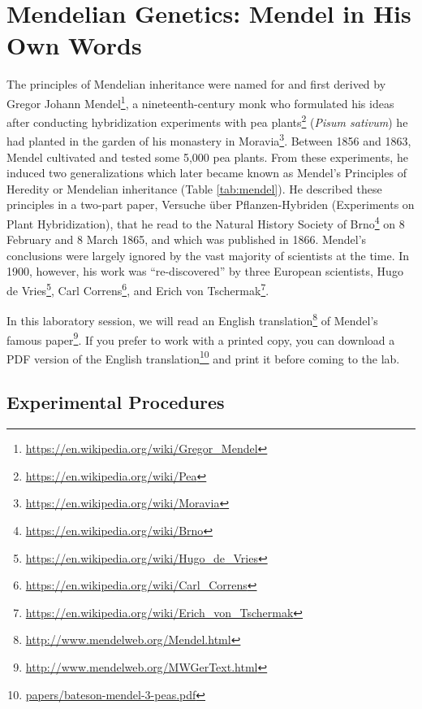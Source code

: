 \documentclass[]{book}
\let\rmarkdownfootnote\footnote%
\def\footnote{\protect\rmarkdownfootnote}
\renewcommand{\href}[2]{#2\footnote{\url{#1}}}
\begin{document}
\chapter{Mendelian Genetics: Mendel in His Own
Words}\label{mendelian-genetics-mendel-in-his-own-words}

The principles of Mendelian inheritance were named for and first derived
by \href{https://en.wikipedia.org/wiki/Gregor_Mendel}{Gregor Johann
Mendel}, a nineteenth-century monk who formulated his ideas after
conducting hybridization experiments with
\href{https://en.wikipedia.org/wiki/Pea}{pea plants} (\emph{Pisum
sativum}) he had planted in the garden of his monastery in
\href{https://en.wikipedia.org/wiki/Moravia}{Moravia}. Between 1856 and
1863, Mendel cultivated and tested some 5,000 pea plants. From these
experiments, he induced two generalizations which later became known as
Mendel's Principles of Heredity or Mendelian inheritance (Table
\ref{tab:mendel}). He described these principles in a two-part paper,
Versuche über Pflanzen-Hybriden (Experiments on Plant Hybridization),
that he read to the Natural History Society of
\href{https://en.wikipedia.org/wiki/Brno}{Brno} on 8 February and 8
March 1865, and which was published in 1866. Mendel's conclusions were
largely ignored by the vast majority of scientists at the time. In 1900,
however, his work was ``re-discovered'' by three European scientists,
\href{https://en.wikipedia.org/wiki/Hugo_de_Vries}{Hugo de Vries},
\href{https://en.wikipedia.org/wiki/Carl_Correns}{Carl Correns}, and
\href{https://en.wikipedia.org/wiki/Erich_von_Tschermak}{Erich von
Tschermak}.

In this laboratory session, we will read an
\href{http://www.mendelweb.org/Mendel.html}{English translation} of
\href{http://www.mendelweb.org/MWGerText.html}{Mendel's famous paper}.
If you prefer to work with a printed copy, you can download a
\href{papers/bateson-mendel-3-peas.pdf}{PDF version of the English
translation} and print it before coming to the lab.

\section{Experimental Procedures}\label{experimental-procedures-2}
\end{document}
